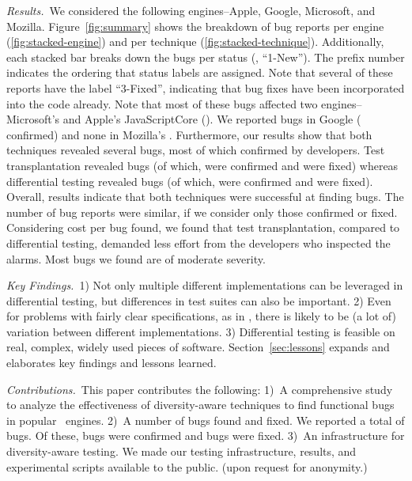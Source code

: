 \documentclass[sigconf,review, anonymous]{acmart}
\begin{document}
\emph{Results.}~We considered the following engines--Apple, Google,
Microsoft, and Mozilla. Figure~\ref{fig:summary} shows the breakdown
of bug reports per engine (\ref{fig:stacked-engine}) and per technique
(\ref{fig:stacked-technique}). Additionally, each stacked bar breaks
down the bugs per status (\eg{}, ``1-New''). The prefix number
indicates the ordering that status labels are assigned. Note that
several of these reports have the label ``3-Fixed'', indicating that
bug fixes have been incorporated into the code already. Note that most
of these bugs affected two engines--Microsoft's \chakra{} and Apple's
JavaScriptCore (\jsc{}).  We reported \noBugsBugsReportedGoogle{} bugs in Google
\veight{} (\noBugsBugsConfirmedGoogle{} confirmed) and none in
Mozilla's \smonkey{}.  Furthermore, our results show that both
techniques revealed several bugs, most of which confirmed by
developers. Test transplantation revealed \noBugsTransplantation{}
bugs (of which, \noBugsTransplantationConfirmed{} were confirmed and
\noBugsTransplantationFixed{} were fixed) whereas differential testing
revealed \noBugsDifferentialTesting{} bugs (of which,
\noBugsDifferentialTestingConfirmed{} were confirmed and
\noBugsDifferentialTestingFixed{} were fixed).  Overall, results
indicate that both techniques were successful at finding bugs. The
number of bug reports were similar, if we consider only those
confirmed or fixed. Considering cost per bug found, we found that test
transplantation, compared to differential testing, demanded less
effort from the developers who inspected the alarms. Most bugs
we found are of moderate severity.


\emph{Key Findings.}~1) Not only multiple different implementations
can be leveraged in differential testing, but differences in test
suites can also be important. 2) Even for problems with fairly clear
specifications, as in \javascript{}, there is likely to be (a lot of)
variation between different implementations. 3) Differential testing
is feasible on real, complex, widely used pieces of
software. Section~\ref{sec:lessons} expands and elaborates key
findings and lessons learned.

\emph{Contributions.}~This paper contributes the following: 1)~A
comprehensive study to analyze the effectiveness of diversity-aware
techniques to find functional bugs in popular \javascript\ engines.
2)~A number of bugs found and fixed. We reported a total of
\totalBugsReported{} bugs. Of these, \totalBugsConfirmed{} bugs were
confirmed and \totalBugsFixed{} bugs were fixed. 3)~An infrastructure
for diversity-aware testing. We made our testing infrastructure,
results, and experimental scripts available to the public. (upon
request for anonymity.)
\end{document}
